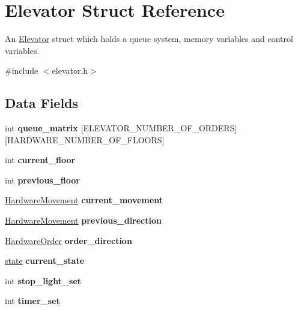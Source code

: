 \hypertarget{structElevator}{}\section{Elevator Struct Reference}
\label{structElevator}


An \hyperlink{structElevator}{Elevator} struct which holds a queue system, memory variables and control variables.  




{\ttfamily \#include $<$elevator.\+h$>$}

\subsection*{Data Fields}
\begin{DoxyCompactItemize}
\item 
\mbox{\label{structElevator_ae9a4535426a6d35fed788c74685a3a1d}} 
int {\bfseries queue\+\_\+matrix} \mbox{[}E\+L\+E\+V\+A\+T\+O\+R\+\_\+\+N\+U\+M\+B\+E\+R\+\_\+\+O\+F\+\_\+\+O\+R\+D\+E\+RS\mbox{]}\mbox{[}H\+A\+R\+D\+W\+A\+R\+E\+\_\+\+N\+U\+M\+B\+E\+R\+\_\+\+O\+F\+\_\+\+F\+L\+O\+O\+RS\mbox{]}
\item 
\mbox{\label{structElevator_aae297f56aca24d7be4518e2b14953015}} 
int {\bfseries current\+\_\+floor}
\item 
\mbox{\label{structElevator_a4872eeb2a2737ff0396fca606f8eaad8}} 
int {\bfseries previous\+\_\+floor}
\item 
\mbox{\label{structElevator_a787e17e94bf318d8757bbdf7ba0c7533}} 
\hyperlink{hardware_8h_a2167c399a24df296afc432bcb88228af}{Hardware\+Movement} {\bfseries current\+\_\+movement}
\item 
\mbox{\label{structElevator_a4fb7d656caf15d55bdb47a603c43054e}} 
\hyperlink{hardware_8h_a2167c399a24df296afc432bcb88228af}{Hardware\+Movement} {\bfseries previous\+\_\+direction}
\item 
\mbox{\label{structElevator_ae20f4287465b4f67528853bebd3d3896}} 
\hyperlink{hardware_8h_a796a8de8ce0ae769d7dbd3327a7bdbe7}{Hardware\+Order} {\bfseries order\+\_\+direction}
\item 
\mbox{\label{structElevator_ad09af9fded96d746e098af616a052ade}} 
\hyperlink{states_8h_adc6e5733fc3c22f0a7b2914188c49c90}{state} {\bfseries current\+\_\+state}
\item 
\mbox{\label{structElevator_a6f567852f3f96cc1a7d1fc15aa4c0ad8}} 
int {\bfseries stop\+\_\+light\+\_\+set}
\item 
\mbox{\label{structElevator_ab473c517dd118bdfd83928ec9afc9408}} 
int {\bfseries timer\+\_\+set}
\end{DoxyCompactItemize}



